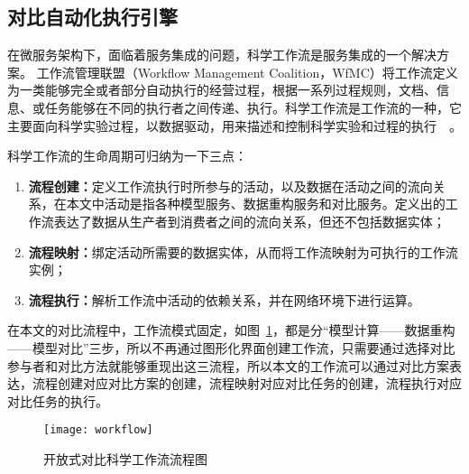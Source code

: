 \subsection{对比自动化执行引擎}
在微服务架构下，面临着服务集成的问题，科学工作流是服务集成的一个解决方案。 %
工作流管理联盟（Workflow Management Coalition，WfMC）将工作流定义为一类能够完全或者部分自动执行的经营过程，根据一系列过程规则，文档、信息、或任务能够在不同的执行者之间传递、执行。科学工作流是工作流的一种，它主要面向科学实验过程，以数据驱动，用来描述和控制科学实验和过程的执行~\cite{ludascher2006scientific}~\cite{Zhao2009Special}。

科学工作流的生命周期可归纳为一下三点：
\begin{enumerate}[(1)]
    \item \textbf{流程创建：}定义工作流执行时所参与的活动，以及数据在活动之间的流向关系，在本文中活动是指各种模型服务、数据重构服务和对比服务。定义出的工作流表达了数据从生产者到消费者之间的流向关系，但还不包括数据实体；
    \item \textbf{流程映射：}绑定活动所需要的数据实体，从而将工作流映射为可执行的工作流实例；
    \item \textbf{流程执行：}解析工作流中活动的依赖关系，并在网络环境下进行运算。
\end{enumerate}

在本文的对比流程中，工作流模式固定，如图~\ref{fig:workflow}，都是分“模型计算——数据重构——模型对比”三步，所以不再通过图形化界面创建工作流，只需要通过选择对比参与者和对比方法就能够重现出这三流程，所以本文的工作流可以通过对比方案表达，流程创建对应对比方案的创建，流程映射对应对比任务的创建，流程执行对应对比任务的执行。


\begin{figure}[!htbp]
    \centering
    \texttt{[image: workflow]}
    \caption{开放式对比科学工作流流程图}
    \label{fig:workflow}
\end{figure}

